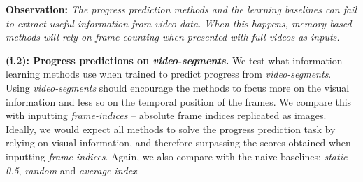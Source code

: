 \smallskip\noindent\textbf{Observation:} \emph{The progress prediction methods and the learning baselines can fail to extract useful information from video data. 
When this happens, memory-based methods will rely on frame counting when presented with \textsl{full-videos} as inputs.}

\medskip\noindent\textbf{(i.2): Progress predictions on \textsl{video-segments}.}
We test what information learning methods use when trained to predict progress from \textsl{video-segments}.
Using \textsl{video-segments} should encourage the methods to focus more on the visual information and less so on the temporal position of the frames. 
We compare this with inputting \textsl{frame-indices} -- absolute frame indices replicated as images.
Ideally, we would expect all methods to solve the progress prediction task by relying on visual information, and therefore surpassing the scores obtained when inputting \textsl{frame-indices}.
Again, we also compare with the naive baselines: \textsl{static-0.5}, \textsl{random} and \textsl{average-index}. 

